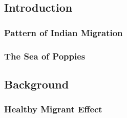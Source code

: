 \subsection{Introduction}

\subsubsection{Pattern of Indian Migration}

\subsubsection{The Sea of Poppies}


\subsection{Background}

\subsubsection{Healthy Migrant Effect}
